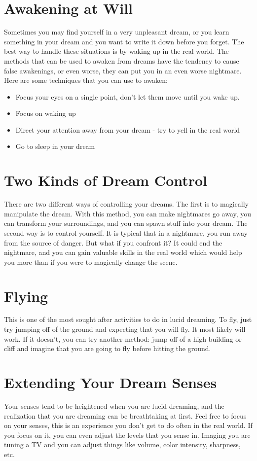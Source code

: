 \documentclass{report}
\begin{document}
\section{Awakening at Will}
Sometimes you may find yourself in a very unpleasant dream, or you learn something in your dream and you want to write it down before you forget. The best way to handle these situations is by waking up in the real world. The methods that can be used to awaken from dreams have the tendency to cause false awakenings, or even worse, they can put you in an even worse nightmare. Here are some techniques that you can use to awaken:

\begin {itemize}
	\item Focus your eyes on a single point, don't let them move until you wake up.
	\item Focus on waking up
	\item Direct your attention away from your dream - try to yell in the real world
	\item Go to sleep in your dream
\end {itemize}

\section{Two Kinds of Dream Control}
There are two different ways of controlling your dreams. The first is to magically manipulate the dream. With this method, you can make nightmares go away, you can transform your surroundings, and you can spawn stuff into your dream. The second way is to control yourself. It is typical that in a nightmare, you run away from the source of danger. But what if you confront it? It could end the nightmare, and you can gain valuable skills in the real world which would help you more than if you were to magically change the scene. 

\section{Flying}
This is one of the most sought after activities to do in lucid dreaming. To fly, just try jumping off of the ground and expecting that you will fly. It most likely will work. If it doesn't, you can try another method: jump off of a high building or cliff and imagine that you are going to fly before hitting the ground.

\section{Extending Your Dream Senses}
Your senses tend to be heightened when you are lucid dreaming, and the realization that you are dreaming can be breathtaking at first. Feel free to focus on your senses, this is an experience you don't get to do often in the real world. If you focus on it, you can even adjust the levels that you sense in. Imaging you are tuning a TV and you can adjust things like volume, color intensity, sharpness, etc.
\end{document}

